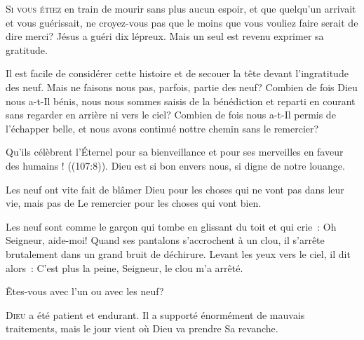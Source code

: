 \lettrine{S}{i vous étiez} en train de mourir sans plus aucun espoir,
 et que quelqu'un arrivait et vous guérissait, ne croyez-vous pas
 que le moins que vous vouliez faire serait de dire merci?
 Jésus a guéri dix lépreux. Mais un seul est revenu exprimer sa gratitude.

Il est facile de considérer cette histoire et de secouer la tête
 devant l'ingratitude des neuf. Mais ne faisons nous pas, parfois,
 partie des neuf? Combien de fois Dieu nous a-t-Il bénis,
 nous nous sommes saisis de la bénédiction et 
 reparti en courant sans regarder en arrière ni vers le ciel?
 Combien de fois nous a-t-Il permis de l'échapper belle,
 et nous avons continué nottre chemin sans le remercier?


\og Qu'ils célèbrent l'Éternel pour sa bienveillance
 et pour ses merveilles en faveur des humains ! \fg{}
 ((107:8)).
 Dieu est si bon envers nous, si digne de notre louange.

Les neuf ont vite fait de blâmer Dieu pour les choses qui ne vont pas
 dans leur vie, mais pas de Le remercier pour les choses qui vont bien.

Les neuf sont comme le garçon qui tombe en glissant du toit
 et qui crie~: 
 \og Oh Seigneur, aide-moi! \fg{} Quand ses pantalons s'accrochent à un clou,
 il s'arrête brutalement dans un grand bruit de déchirure.
 Levant les yeux vers le ciel, il dit alors~: 
 \og C'est plus la peine, Seigneur, le clou m'a arrêté. \fg{}

Êtes-vous avec l'un ou avec les neuf?

\dvrule






\lettrine{D}{ieu} a été patient et endurant.
 Il a supporté énormément de mauvais traitements,
 mais le jour vient où Dieu va prendre Sa revanche.

